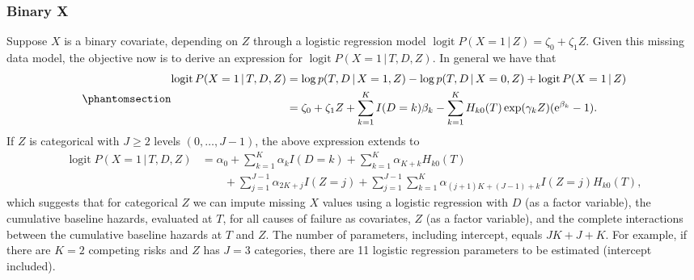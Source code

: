\documentclass[
  letterpaper,
  DIV=11,
  numbers=noendperiod]{scrreprt}
\DeclareMathOperator{\logit}{logit}
\newcommand{\given}{\,|\,}
\begin{document}
\subsubsection*{Binary X}\label{binary-x-1}

Suppose \(X\) is a binary covariate, depending on \(Z\) through a
logistic regression model
\(\logit P(X = 1 \given Z) = \zeta_0 + \zeta_1 Z\). Given this missing
data model, the objective now is to derive an expression for
\(\logit P(X = 1 \given T, D, Z)\). In general we have that
\begin{equation}\phantomsection\label{eq-imp-bin}{
\begin{aligned}
    \logit P(X = 1 \given T, D, Z) &= \log p(T, D \given X = 1, Z) - \log p(T, D \given X = 0, Z) + \logit P(X = 1 \given Z)  \\
    &= \zeta_0 + \zeta_1 Z + \sum^K_{k = 1} I(D=k) \beta_k - \sum^K_{k = 1} H_{k0}(T)\exp(\gamma_k Z)(\mathrm{e}^{\beta_k}  - 1). 
\end{aligned}
}\end{equation} If \(Z\) is categorical with \(J \geq 2\) levels
\((0, \ldots, J-1)\), the above expression extends to \begin{align*}
    \logit P(X = 1 \given T, D, Z) &= \alpha_0 + \sum^K_{k = 1}\alpha_k I(D=k) + \sum^K_{k = 1} \alpha_{K+k} H_{k0}(T) \nonumber \\
    &\qquad + \sum^{J-1}_{j=1}\alpha_{2K + j}I(Z = j) + \sum^{J-1}_{j=1} \sum^K_{k = 1} \alpha_{(j+1)K + (J-1) + k}I(Z = j) H_{k0}(T),
\end{align*} which suggests that for categorical \(Z\) we can impute
missing \(X\) values using a logistic regression with \(D\) (as a factor
variable), the cumulative baseline hazards, evaluated at \(T\), for all
causes of failure as covariates, \(Z\) (as a factor variable), and the
complete interactions between the cumulative baseline hazards at \(T\)
and \(Z\). The number of parameters, including intercept, equals
\(JK + J + K\). For example, if there are \(K = 2\) competing risks and
\(Z\) has \(J = 3\) categories, there are 11 logistic regression
parameters to be estimated (intercept included).
\end{document}
